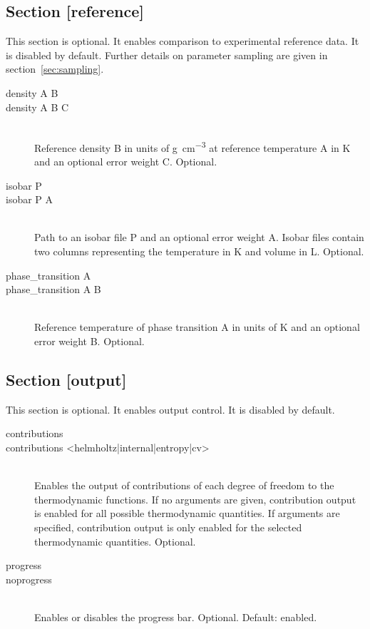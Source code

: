 \documentclass{scrartcl}
\begin{document}
\subsection{Section [reference]}

This section is optional.
It enables comparison to experimental reference data.
It is disabled by default.
Further details on parameter sampling are given in section~\vref{sec:sampling}.

\begin{description}
    \item[density A B]
    \item[density A B C] \hfill \\
        Reference density B in units of \si{\gram\per\cubic\centi\meter} at reference temperature A in \si{\kelvin} and an optional error weight C.
        Optional.
        \vspace{0.1cm}
    \item[isobar P]
    \item[isobar P A] \hfill \\
        Path to an isobar file P and an optional error weight A.
        Isobar files contain two columns representing the temperature in \si{\kelvin} and volume in \si{\liter}.
        Optional.
        \vspace{0.1cm}
    \item[phase\_transition A]
    \item[phase\_transition A B] \hfill \\
        Reference temperature of phase transition A in units of \si{\kelvin} and an optional error weight B.
        Optional.
\end{description}

\subsection{Section [output]}

This section is optional.
It enables output control.
It is disabled by default.

\begin{description}
    \item[contributions]
    \item[contributions <helmholtz|internal|entropy|cv>] \hfill \\
        Enables the output of contributions of each degree of freedom to the thermodynamic functions.
        If no arguments are given, contribution output is enabled for all possible thermodynamic quantities.
        If arguments are specified, contribution output is only enabled for the selected thermodynamic quantities.
        Optional.
    \item[progress]
    \item[noprogress] \hfill \\
        Enables or disables the progress bar.
        Optional. Default: enabled.
\end{description}
\end{document}
